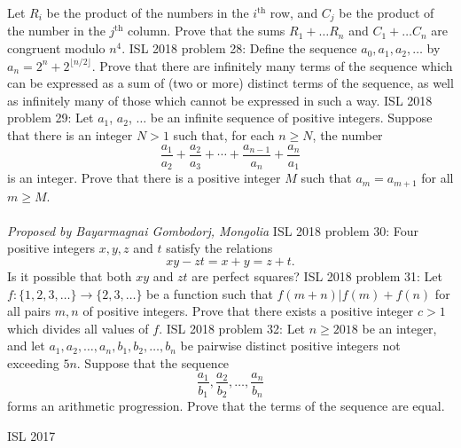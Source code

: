 Let $R_i$ be the product of the numbers in the $i^{\text{th}}$ row, and $C_j$ be the product of the number in the $j^{\text{th}}$ column. Prove that the sums $R_1+\hdots R_n$ and $C_1+\hdots C_n$ are congruent modulo $n^4$. 
ISL 2018 problem 28:  Define the sequence $a_0,a_1,a_2,\hdots$ by $a_n=2^n+2^{\lfloor n/2\rfloor}$. Prove that there are infinitely many terms of the sequence which can be expressed as a sum of (two or more) distinct terms of the sequence, as well as infinitely many of those which cannot be expressed in such a way. 
ISL 2018 problem 29:  Let $a_1$, $a_2$, $\ldots$ be an infinite sequence of positive integers. Suppose that there is an integer $N > 1$ such that, for each $n \geq N$, the number
\[ \frac{a_1}{a_2} + \frac{a_2}{a_3} + \cdots + \frac{a_{n-1}}{a_n} + \frac{a_n}{a_1} \]
is an integer. Prove that there is a positive integer $M$ such that $a_m = a_{m+1}$ for all $m \geq M$. \\\\
\textit{Proposed by Bayarmagnai Gombodorj, Mongolia} 
ISL 2018 problem 30:  Four positive integers $x,y,z$ and $t$ satisfy the relations
\[ xy - zt = x + y = z + t. \]
Is it possible that both $xy$ and $zt$ are perfect squares? 
ISL 2018 problem 31:  Let $f : \{ 1, 2, 3, \dots \} \to \{ 2, 3, \dots \}$ be a function such that $f(m + n) | f(m) + f(n) $ for all pairs $m,n$ of positive integers. Prove that there exists a positive integer $c > 1$ which divides all values of $f$. 
ISL 2018 problem 32:  Let $n \ge 2018$ be an integer, and let $a_1, a_2, \dots, a_n, b_1, b_2, \dots, b_n$ be pairwise distinct positive integers not exceeding $5n$. Suppose that the sequence
\[ \frac{a_1}{b_1}, \frac{a_2}{b_2}, \dots, \frac{a_n}{b_n} \]
forms an arithmetic progression. Prove that the terms of the sequence are equal. 

ISL 2017 

